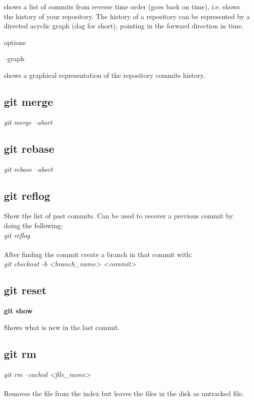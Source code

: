 shows a list of commits from reverse time order (goes back on time), i.e. shows the history of your repository. The history of a repository can be represented by a directed acyclic graph (dag for short), pointing in the forward direction in time.

options

--graph

 shows a graphical representation of the repository commits history.

\subsection{git merge}

\emph{git merge --abort}

\subsection{git rebase}

\emph{git rebase --abort}

\subsection{git reflog}

Show the list of past commits. Can be used to recover a previous commit by doing the following:\\

\emph{git reflog}\\
\\
%
After finding the commit create a branch in that commit with:\\

\emph{git checkout -b <branch\_name> <commit>}\\

\subsection{git reset}

\textbf{git show}

Shows what is new in the last commit.

\subsection{git rm}

\emph{git rm --cached <file\_name>}\\
\\
Removes the file from the index but leaves the files in the disk as untracked file.

